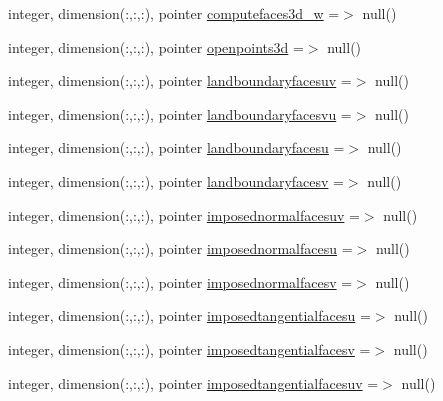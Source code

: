 \begin{DoxyCompactItemize}
\item 
integer, dimension(\+:,\+:,\+:), pointer \mbox{\hyperlink{structmodulehydrodynamic_1_1t__external_ac9c3d5152f1218d19299d35bc1af5ba3}{computefaces3d\+\_\+w}} =$>$ null()
\item 
integer, dimension(\+:,\+:,\+:), pointer \mbox{\hyperlink{structmodulehydrodynamic_1_1t__external_add8be4ad79bb237058e937f7088d9fa9}{openpoints3d}} =$>$ null()
\item 
integer, dimension(\+:,\+:,\+:), pointer \mbox{\hyperlink{structmodulehydrodynamic_1_1t__external_a877f904f7231f1fa1e2ecddad728f1f8}{landboundaryfacesuv}} =$>$ null()
\item 
integer, dimension(\+:,\+:,\+:), pointer \mbox{\hyperlink{structmodulehydrodynamic_1_1t__external_ac0722a7265c10e16592d12b4068c7c88}{landboundaryfacesvu}} =$>$ null()
\item 
integer, dimension(\+:,\+:,\+:), pointer \mbox{\hyperlink{structmodulehydrodynamic_1_1t__external_aeb25f19b1bc1c24f1f85139110e78a3e}{landboundaryfacesu}} =$>$ null()
\item 
integer, dimension(\+:,\+:,\+:), pointer \mbox{\hyperlink{structmodulehydrodynamic_1_1t__external_adcd4b8458e75c4af37b25992e5bf3218}{landboundaryfacesv}} =$>$ null()
\item 
integer, dimension(\+:,\+:,\+:), pointer \mbox{\hyperlink{structmodulehydrodynamic_1_1t__external_ad5aa628017441d887d9630629add74a8}{imposednormalfacesuv}} =$>$ null()
\item 
integer, dimension(\+:,\+:,\+:), pointer \mbox{\hyperlink{structmodulehydrodynamic_1_1t__external_ad0216994f9e05379bd4ad0c29ec3f7fe}{imposednormalfacesu}} =$>$ null()
\item 
integer, dimension(\+:,\+:,\+:), pointer \mbox{\hyperlink{structmodulehydrodynamic_1_1t__external_a744fdc71b353d325a7d31a72d06d170c}{imposednormalfacesv}} =$>$ null()
\item 
integer, dimension(\+:,\+:,\+:), pointer \mbox{\hyperlink{structmodulehydrodynamic_1_1t__external_a6e20c013ff6ed24d514a812d3044a02b}{imposedtangentialfacesu}} =$>$ null()
\item 
integer, dimension(\+:,\+:,\+:), pointer \mbox{\hyperlink{structmodulehydrodynamic_1_1t__external_a784ca9141c2dae5003a9dfdbde41bb4e}{imposedtangentialfacesv}} =$>$ null()
\item 
integer, dimension(\+:,\+:,\+:), pointer \mbox{\hyperlink{structmodulehydrodynamic_1_1t__external_a0d7e01f3b9fb4e4f0ca7076967ebeee0}{imposedtangentialfacesuv}} =$>$ null()
\item 

\end{DoxyCompactItemize}
